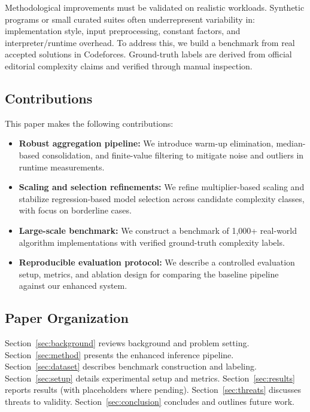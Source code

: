 \documentclass[conference]{IEEEtran}
\begin{document}
Methodological improvements must be validated on realistic workloads.
Synthetic programs or small curated suites often underrepresent variability in:
implementation style,
input preprocessing,
constant factors,
and interpreter/runtime overhead.
To address this, we build a benchmark from real accepted solutions in
Codeforces.
Ground-truth labels are derived from official editorial complexity claims and
verified through manual inspection.

\subsection{Contributions}

This paper makes the following contributions:
\begin{itemize}[leftmargin=1.2em]
\item \textbf{Robust aggregation pipeline:}
We introduce warm-up elimination, median-based consolidation, and finite-value
filtering to mitigate noise and outliers in runtime measurements.
\item \textbf{Scaling and selection refinements:}
We refine multiplier-based scaling and stabilize regression-based model
selection across candidate complexity classes, with focus on borderline cases.
\item \textbf{Large-scale benchmark:}
We construct a benchmark of 1,000+ real-world algorithm implementations with
verified ground-truth complexity labels.
\item \textbf{Reproducible evaluation protocol:}
We describe a controlled evaluation setup, metrics, and ablation design for
comparing the baseline pipeline against our enhanced system.
\end{itemize}

\subsection{Paper Organization}

Section~\ref{sec:background} reviews background and problem setting.
Section~\ref{sec:method} presents the enhanced inference pipeline.
Section~\ref{sec:dataset} describes benchmark construction and labeling.
Section~\ref{sec:setup} details experimental setup and metrics.
Section~\ref{sec:results} reports results (with placeholders where pending).
Section~\ref{sec:threats} discusses threats to validity.
Section~\ref{sec:conclusion} concludes and outlines future work.

\end{document}
